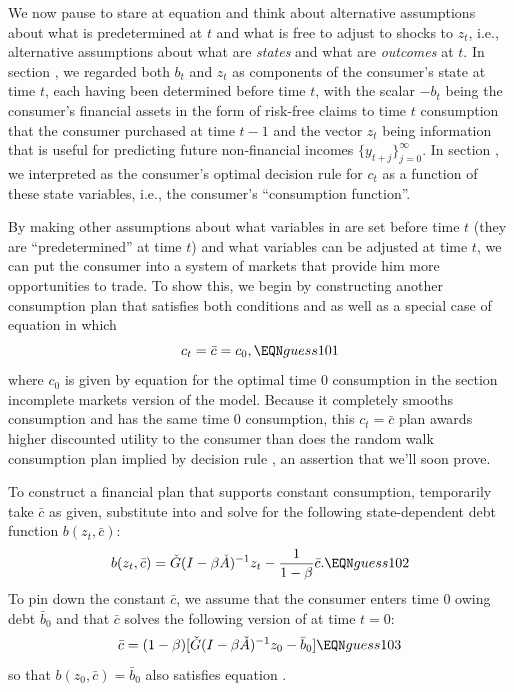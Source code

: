 We now pause to stare at equation  and  think about alternative  assumptions about what is predetermined at $t$ and
what is free to adjust to shocks to $z_t$, i.e., alternative assumptions about what are {\it states\/}  and what are {\it outcomes\/} at $t$.
   In section , we regarded both $b_t$ and $z_t$ as components of the consumer's  state 
at time $t$,  each having been determined before time $t$,  with the scalar $-b_t$  being the consumer's financial assets in the form 
of risk-free claims to time $t$ consumption that the consumer purchased at time $t-1$ and the vector $z_t$ being information that is useful for predicting future non-financial
incomes $\{y_{t+j}\}_{j=0}^\infty$.  In section ,  we interpreted   as the  consumer's  optimal decision rule for  $c_t$ as a function of these
state variables,
i.e., the consumer's ``consumption function''.   

By making other assumptions about what variables in   are set before time $t$ (they are  ``predetermined'' at time $t$)
and what variables can  be adjusted  at time $t$, we can put the consumer into a system of markets that provide him more opportunities
to trade. To show this, we begin by constructing another  consumption plan that satisfies both conditions  and  as well
as a special case of  equation  in which 
$$ c_t = \bar c  = c_0 , \EQN guess101 $$
where  $c_0$ is given by equation   for  the  optimal time $0$ consumption
in the section   incomplete markets version of the model.    Because it  completely smooths consumption and has
the same time $0$ consumption, 
this  $c_t = \bar c$ plan awards higher discounted utility to the consumer
than does  the random walk consumption plan
implied by decision rule , an assertion that we'll soon prove.

 To construct a financial plan that supports constant consumption, temporarily take $\bar c$ as given, substitute  into
 and solve for the following state-dependent debt function $b(z_t, \bar c)$:
$$ b(z_t, \bar c) =  \check G(I-\beta \check A)^{-1} z_t - {\frac{1}{1-\beta}} \bar c . \EQN guess102 $$
To pin down the constant $\bar c$, we assume that the consumer enters time $0$ owing debt $\bar b_0$ and that $\bar c$ solves  the following version of  at time $t=0$:
$$ \bar c = (1 -\beta) [ \check G(I-\beta \check A)^{-1} z_0 -  \bar b_0 ]  \EQN guess103 $$
so that $b(z_0, \bar c) = \bar b_0$ also satisfies equation .
 

